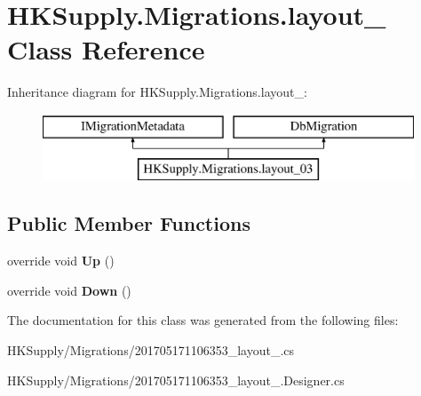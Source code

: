 \hypertarget{class_h_k_supply_1_1_migrations_1_1layout__03}{}\section{H\+K\+Supply.\+Migrations.\+layout\+\_ Class Reference}
\label{class_h_k_supply_1_1_migrations_1_1layout__03}
Inheritance diagram for H\+K\+Supply.\+Migrations.\+layout\+\_\+:\begin{figure}[H]
\begin{center}
\leavevmode
\includegraphics[height=2.000000cm]{class_h_k_supply_1_1_migrations_1_1layout__03}
\end{center}
\end{figure}
\subsection*{Public Member Functions}
\begin{DoxyCompactItemize}
\item 
\mbox{\label{class_h_k_supply_1_1_migrations_1_1layout__03_adbf957271d4a665577e7218b62ca53b1}} 
override void {\bfseries Up} ()
\item 
\mbox{\label{class_h_k_supply_1_1_migrations_1_1layout__03_ace448a6cc75d751c6873991796cfa3c9}} 
override void {\bfseries Down} ()
\end{DoxyCompactItemize}


The documentation for this class was generated from the following files\+:\begin{DoxyCompactItemize}
\item 
H\+K\+Supply/\+Migrations/201705171106353\+\_\+layout\+\_.\+cs\item 
H\+K\+Supply/\+Migrations/201705171106353\+\_\+layout\+\_.\+Designer.\+cs\end{DoxyCompactItemize}
